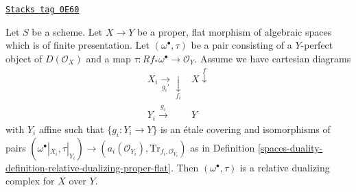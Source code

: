 \begin{lemma}
\label{spaces-duality-lemma-covering-enough}
\href{https://stacks.math.columbia.edu/tag/0E60}{\texttt{Stacks tag 0E60}}

Let $S$ be a scheme. Let $X \to Y$ be a proper, flat morphism of
algebraic spaces which is of finite presentation.
Let $(\omega^\bullet, \tau)$ be a pair consisting
of a $Y$-perfect object of $D(\mathcal{O}_X)$ and a map
$\tau : Rf_*\omega^\bullet \to \mathcal{O}_Y$.
Assume we have cartesian diagrams
$$
\begin{array}{cc}X_i \underset{g_i'}{\longrightarrow}\underset{f_i}{\downarrow} & X \overset{f}{\downarrow} \\ Y_i \overset{g_i}{\longrightarrow} & Y\end{array}
$$
with $Y_i$ affine such that $\{g_i : Y_i \to Y\}$ is an \'etale covering
and isomorphisms of pairs $(\omega^\bullet|_{X_i}, \tau|_{Y_i})
\to (a_i(\mathcal{O}_{Y_i}), \text{Tr}_{f_i, \mathcal{O}_{Y_i}})$
as in Definition \ref{spaces-duality-definition-relative-dualizing-proper-flat}.
Then $(\omega^\bullet, \tau)$ is a relative dualizing complex for $X$ over $Y$.
\end{lemma}


